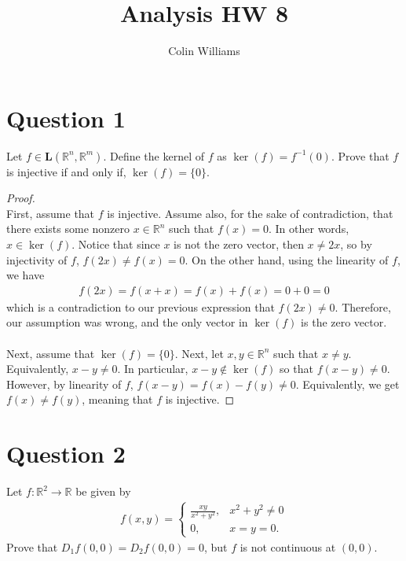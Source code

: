 \documentclass[10pt,a4paper]{article}
\title{Analysis HW 8}
\author{Colin Williams}
\theoremstyle{definition}
\theoremstyle{definition}
\numberwithin{equation}{section}
\begin{document}
\maketitle

\section*{Question 1}
Let $f \in \mathbf{L}(\mathbb{R}^n, \mathbb{R}^m)$. Define the kernel of $f$ as $\ker(f) = f^{-1}(0)$. Prove that $f$ is injective if and only if, $\ker(f) = \{0\}$. 

\begin{proof}$ $
\\First, assume that $f$ is injective. Assume also, for the sake of contradiction, that there exists some nonzero $x \in \mathbb{R}^n$ such that $f(x) = 0$. In other words, $x \in \ker(f)$. Notice that since $x$ is not the zero vector, then $x \neq 2x$, so by injectivity of $f$, $f(2x) \neq f(x) = 0$. On the other hand, using the linearity of $f$, we have
\begin{align*}
f(2x) = f(x + x) = f(x) + f(x) = 0 + 0 = 0
\end{align*}
which is a contradiction to our previous expression that $f(2x) \neq 0$. Therefore, our assumption was wrong, and the only vector in $\ker(f)$ is the zero vector. 
\\
\\Next, assume that $\ker(f) = \{0\}$. Next, let $x, y \in \mathbb{R}^n$ such that $x \neq y$. Equivalently, $x - y \neq 0$. In particular, $x - y \not \in \ker(f)$ so that $f(x - y) \neq 0$. However, by linearity of $f$, $f(x - y) = f(x) - f(y) \neq 0$. Equivalently, we get $f(x) \neq f(y)$, meaning that $f$ is injective. 
\end{proof}


\section*{Question 2}
Let $f: \mathbb{R}^2 \to \mathbb{R}$ be given by 
\begin{align*}
f(x, y) = \begin{cases}
\displaystyle \frac{xy}{x^2 + y^2}, &x^2 + y^2 \neq 0\\
0, &x = y = 0.
\end{cases}
\end{align*}
Prove that $D_1f(0,0) = D_2f(0,0) = 0$, but $f$ is not continuous at $(0,0)$. 
\end{document}
